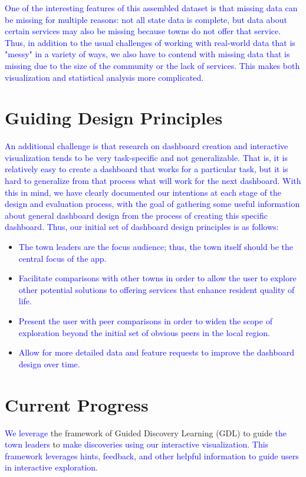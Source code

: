 \documentclass[10pt]{article}\usepackage[]{graphicx}\usepackage[]{color}
\newcommand{\svp}[1]{{\textcolor{blue}{#1}}}
\begin{document}
\svp{One of the interesting features of this assembled dataset is that missing data can be missing for multiple reasons: not all state data is complete, but data about certain services may also be missing because towns do not offer that service.}
\svp{Thus, in addition to the usual challenges of working with real-world data that is "messy" in a variety of ways, we also have to contend with missing data that is missing due to the size of the community or the lack of services. This makes both visualization and statistical analysis more complicated.}

\section{Guiding Design Principles}
\svp{An additional challenge is that research on dashboard creation and interactive visualization tends to be very task-specific and not generalizable. That is, it is relatively easy to create a dashboard that works for a particular task, but it is hard to generalize from that process what will work for the next dashboard. With this in mind, we have clearly documented our intentions at each stage of the design and evaluation process, with the goal of gathering some useful information about general dashboard design from the process of creating this specific dashboard.}
\svp{Thus, our initial set of dashboard design principles is as follows: }
\begin{itemize}
\item \svp{The town leaders are the focus audience; thus, the town itself should be the central focus of the app.}
\item \svp{Facilitate comparisons with other towns in order to allow the user to explore other potential solutions to offering services that enhance resident quality of life.}
\item \svp{Present the user with peer comparisons in order to widen the scope of exploration beyond the initial set of obvious peers in the local region.}
\item \svp{Allow for more detailed data and feature requests to improve the dashboard design over time.}
\end{itemize}


\section{Current Progress}
\svp{We leverage} the framework of Guided Discovery Learning (GDL) to guide \svp{the town leaders} to \svp{make discoveries using our interactive visualization}. \svp{This framework leverages hints, feedback, and other helpful information to guide users in interactive exploration}\cite{dedonno}.
\end{document}
